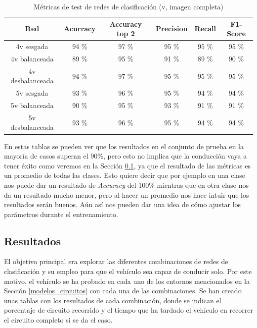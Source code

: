 \begin{table}[H]
\centering
\caption{Métricas de test de redes de clasificación (v, imagen completa)}
\label{metricas_classificacion_completa_v}
\begin{tabular}{c|c|c|c|c|c|}
\cline{1-6}
                        \multicolumn{1}{|c|}{Red}    & Acurracy       & Accuracy top 2      & Precision       & Recall        & F1-Score        \\ \hline
\multicolumn{1}{|c|}{4v sesgada}    & 94 \%    & 97 \%         & 95 \%            & 95 \%          & 95 \%       \\ \hline
\multicolumn{1}{|c|}{4v balanceada}     & 89 \%       & 95 \%          &  91 \%              &  89 \%            &  90 \%             \\ \hline
\multicolumn{1}{|c|}{4v desbalanceada}      &  94 \%      & 97 \%           &  95 \%            & 95 \%        &  95 \%            \\ \hline
\multicolumn{1}{|c|}{5v sesgada}       &   93 \%      &  96 \%      &  95 \%             &   94 \%           &  94 \%               \\ \hline
\multicolumn{1}{|c|}{5v balanceada}      &  90 \%       &  95 \%         &  93 \%         &  91 \%       &  91 \%            \\ \hline
\multicolumn{1}{|c|}{5v desbalanceada}  &  93 \%      &  96 \%           &  95 \%         &  94 \%         &  94 \%    \\ \hline
\end{tabular}
\end{table}

En estas tablas se pueden ver que los resultados en el conjunto de prueba en la mayoría de casos superan el 90\%, pero esto no implica que la conducción vaya a tener éxito como veremos en la Sección \ref{resultados_clasificacion}, ya que el resultado de las métricas es un promedio de todas las clases. Esto quiere decir que por ejemplo en una clase nos puede dar un resultado de \textit{Accuracy} del 100\% mientras que en otra clase nos da un resultado mucho menor, pero al hacer un promedio nos hace intuir que los resultados serán buenos. Aún así nos pueden dar una idea de cómo ajustar los parámetros durante el entrenamiento.


\subsection{Resultados}\label{resultados_clasificacion}

El objetivo principal era explorar las diferentes combinaciones de redes de clasificación y su empleo para que el vehículo sea capaz de conducir solo. Por este motivo, el vehículo se ha probado en cada uno de los entornos mencionados en la Sección \ref{modelos_circuitos} con cada una de las combinaciones. Se han creado unas tablas con los resultados de cada combinación, donde se indican el porcentaje de circuito recorrido y el tiempo que ha tardado el vehículo en recorrer el circuito completo si se da el caso.\\

